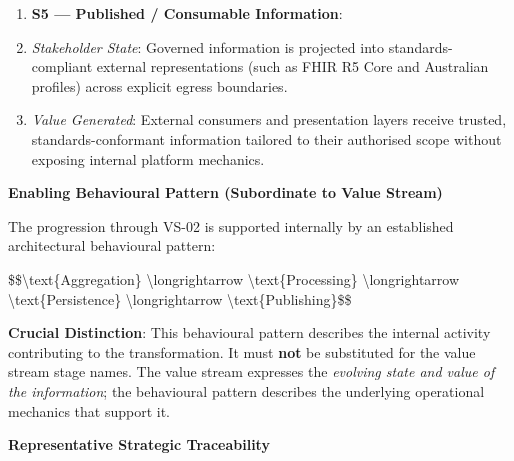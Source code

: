 \begin{enumerate}
\item \textbf{S5 — Published / Consumable Information}:

\item \emph{Stakeholder State}: Governed information is projected into standards-compliant external representations (such as FHIR R5 Core and Australian profiles) across explicit egress boundaries.

\item \emph{Value Generated}: External consumers and presentation layers receive trusted, standards-conformant information tailored to their authorised scope without exposing internal platform mechanics.

\end{enumerate}


\par\medskip\textbf{Enabling Behavioural Pattern (Subordinate to Value Stream)}\par


The progression through VS-02 is supported internally by an established architectural behavioural pattern:



\$\$\textbackslash{}text\{Aggregation\} \textbackslash{}longrightarrow \textbackslash{}text\{Processing\} \textbackslash{}longrightarrow \textbackslash{}text\{Persistence\} \textbackslash{}longrightarrow \textbackslash{}text\{Publishing\}\$\$



\textbf{Crucial Distinction}: This behavioural pattern describes the internal activity contributing to the transformation. It must \textbf{not} be substituted for the value stream stage names. The value stream expresses the \emph{evolving state and value of the information}; the behavioural pattern describes the underlying operational mechanics that support it.



\par\medskip\textbf{Representative Strategic Traceability}\par



